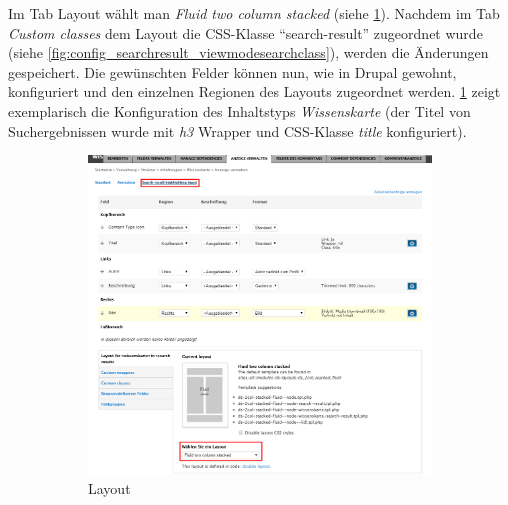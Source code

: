 Im Tab Layout wählt man \textit{Fluid two column stacked} (siehe \cref{fig:config_searchresult_viewmodesearch}). Nachdem im Tab \textit{Custom classes} dem Layout die CSS-Klasse \enquote{search-result} zugeordnet wurde (siehe \cref{fig:config_searchresult_viewmodesearchclass}), werden die Änderungen gespeichert. Die gewünschten Felder können nun, wie in Drupal gewohnt, konfiguriert und den einzelnen Regionen des Layouts zugeordnet werden. \cref{fig:config_searchresult_viewmodesearch} zeigt exemplarisch die Konfiguration des Inhaltstyps \textit{Wissenskarte} (der Titel von Suchergebnissen wurde \zB mit \textit{h3} Wrapper und CSS-Klasse \textit{title} konfiguriert).


\begin{figure}[H]
	\centering
	\begin{subfigure}[b]{0.55\textwidth}
		\centering
		\includegraphics[height=0.35\textheight]{images/config_searchresult_viewmodesearch}
		\caption[]{Layout}
		\label{fig:config_searchresult_viewmodesearch}
	\end{subfigure}
	\begin{subfigure}[b]{0.30\textwidth}
		\centering

\end{subfigure}
\end{figure}
